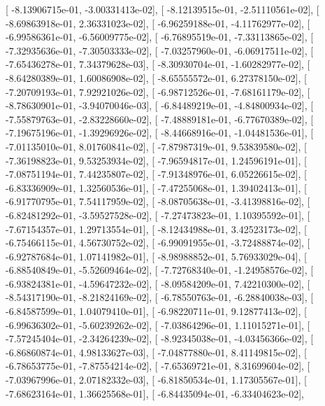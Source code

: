 \documentclass{article}
\begin{document}
       [ -8.13906715e-01,  -3.00331413e-02],
       [ -8.12139515e-01,  -2.51110561e-02],
       [ -8.69863918e-01,   2.36331023e-02],
       [ -6.96259188e-01,  -4.11762977e-02],
       [ -6.99586361e-01,  -6.56009775e-02],
       [ -6.76895519e-01,  -7.33113865e-02],
       [ -7.32935636e-01,  -7.30503333e-02],
       [ -7.03257960e-01,  -6.06917511e-02],
       [ -7.65436278e-01,   7.34379628e-03],
       [ -8.30930704e-01,  -1.60282977e-02],
       [ -8.64280389e-01,   1.60086908e-02],
       [ -8.65555572e-01,   6.27378150e-02],
       [ -7.20709193e-01,   7.92921026e-02],
       [ -6.98712526e-01,  -7.68161179e-02],
       [ -8.78630901e-01,  -3.94070046e-03],
       [ -6.84489219e-01,  -4.84800934e-02],
       [ -7.55879763e-01,  -2.83228660e-02],
       [ -7.48889181e-01,  -6.77670389e-02],
       [ -7.19675196e-01,  -1.39296926e-02],
       [ -8.44668916e-01,  -1.04481536e-01],
       [ -7.01135010e-01,   8.01760841e-02],
       [ -7.87987319e-01,   9.53839580e-02],
       [ -7.36198823e-01,   9.53253934e-02],
       [ -7.96594817e-01,   1.24596191e-01],
       [ -7.08751194e-01,   7.44235807e-02],
       [ -7.91348976e-01,   6.05226615e-02],
       [ -6.83336909e-01,   1.32560536e-01],
       [ -7.47255068e-01,   1.39402413e-01],
       [ -6.91770795e-01,   7.54117959e-02],
       [ -8.08705638e-01,  -3.41398816e-02],
       [ -6.82481292e-01,  -3.59527528e-02],
       [ -7.27473823e-01,   1.10395592e-01],
       [ -7.67154357e-01,   1.29713554e-01],
       [ -8.12434988e-01,   3.42523173e-02],
       [ -6.75466115e-01,   4.56730752e-02],
       [ -6.99091955e-01,  -3.72488874e-02],
       [ -6.92787684e-01,   1.07141982e-01],
       [ -8.98988852e-01,   5.76933029e-04],
       [ -6.88540849e-01,  -5.52609464e-02],
       [ -7.72768340e-01,  -1.24958576e-02],
       [ -6.93824381e-01,  -4.59647232e-02],
       [ -8.09584209e-01,   7.42210300e-02],
       [ -8.54317190e-01,  -8.21824169e-02],
       [ -6.78550763e-01,  -6.28840038e-03],
       [ -6.84587599e-01,   1.04079410e-01],
       [ -6.98220711e-01,   9.12877413e-02],
       [ -6.99636302e-01,  -5.60239262e-02],
       [ -7.03864296e-01,   1.11015271e-01],
       [ -7.57245404e-01,  -2.34264239e-02],
       [ -8.92345038e-01,  -4.03456366e-02],
       [ -6.86860874e-01,   4.98133627e-03],
       [ -7.04877880e-01,   8.41149815e-02],
       [ -6.78653775e-01,  -7.87554214e-02],
       [ -7.65369721e-01,   8.31699604e-02],
       [ -7.03967996e-01,   2.07182332e-03],
       [ -6.81850534e-01,   1.17305567e-01],
       [ -7.68623164e-01,   1.36625568e-01],
       [ -6.84435094e-01,  -6.33404623e-02],
\end{document}
